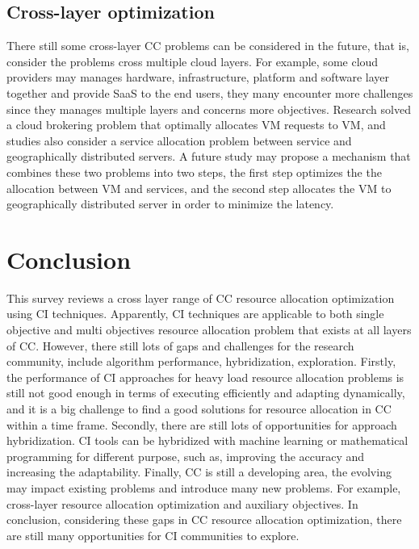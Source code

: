 \documentclass[onecolumn,10pt]{asme2ej}
\begin{document}
\subsection{Cross-layer optimization}
There still some cross-layer CC problems can be considered in the future, that is, consider the problems cross multiple cloud layers. For example, some cloud providers may manages hardware, infrastructure, platform and software layer together and provide SaaS to the end users, they many encounter more challenges since they manages multiple layers and concerns more objectives. Research \cite{iturriaga2013parallel} solved a cloud brokering problem that optimally allocates VM requests to VM, and studies \cite{tan2016optimization,tan2016particle, tan2017binary} also consider a service allocation problem between service and geographically distributed servers. A future study may propose a mechanism that combines these two problems into two steps, the first step optimizes the the allocation between VM and services, and the second step allocates the VM to geographically distributed server in order to minimize the latency. 

\section{Conclusion}
This survey reviews a cross layer range of CC resource allocation optimization using CI techniques. Apparently, CI techniques are applicable to both single objective and multi objectives resource allocation problem that exists at all layers of CC. However, there still lots of gaps and challenges for the research community, include algorithm performance, hybridization, exploration. Firstly, the performance of CI approaches for heavy load resource allocation problems is still not good enough in terms of executing efficiently and adapting dynamically, and it is a big challenge to find a good solutions for resource allocation in CC within a time frame. Secondly, there are still lots of opportunities for approach hybridization. CI tools can be hybridized with machine learning or mathematical programming for different purpose, such as, improving the accuracy and increasing the adaptability. Finally, CC is still a developing area, the evolving may impact existing problems and introduce many new problems. For example, cross-layer resource allocation optimization and auxiliary objectives. In conclusion, considering these gaps in CC resource allocation optimization, there are still many opportunities for CI communities to explore.  
\end{document}

